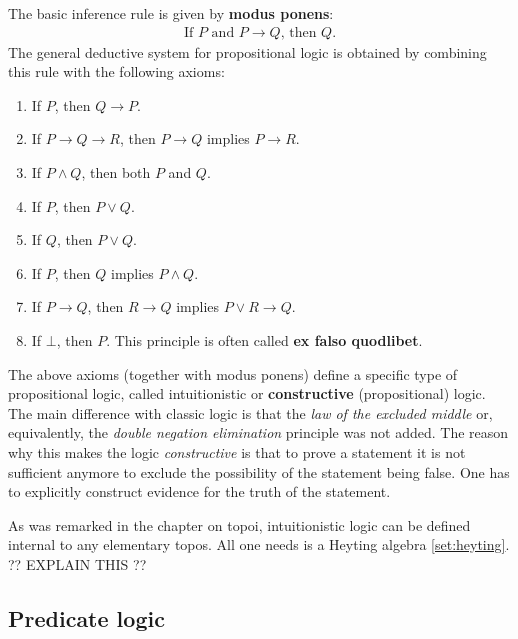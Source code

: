     The basic inference rule is given by \textbf{modus ponens}:
    \begin{gather}
        \text{If } P \text{ and } P\rightarrow Q \text{, then } Q.
    \end{gather}
    The general deductive system for propositional logic is obtained by combining this rule with the following axioms:
    \begin{enumerate}
        \item If $P$, then $Q\rightarrow P$.
        \item If $P\rightarrow Q \rightarrow R$, then $P\rightarrow Q$ implies $P\rightarrow R$.
        \item If $P\land Q$, then both $P$ and $Q$.
        \item If $P$, then $P\lor Q$.
        \item If $Q$, then $P\lor Q$.
        \item If $P$, then $Q$ implies $P\land Q$.
        \item If $P\rightarrow Q$, then $R\rightarrow Q$ implies $P\lor R\rightarrow Q$.
        \item If $\bot$, then $P$. This principle is often called \textbf{ex falso quodlibet}.
    \end{enumerate}

    \begin{remark}
        The above axioms (together with modus ponens) define a specific type of propositional logic, called intuitionistic or \textbf{constructive} (propositional) logic. The main difference with classic logic is that the \textit{law of the excluded middle} or, equivalently, the \textit{double negation elimination} principle was not added. The reason why this makes the logic \textit{constructive} is that to prove a statement it is not sufficient anymore to exclude the possibility of the statement being false. One has to explicitly construct evidence for the truth of the statement.

        As was remarked in the chapter on topoi, intuitionistic logic can be defined internal to any elementary topos. All one needs is a Heyting algebra \ref{set:heyting}. ?? EXPLAIN THIS ??
    \end{remark}

\subsection{Predicate logic}

